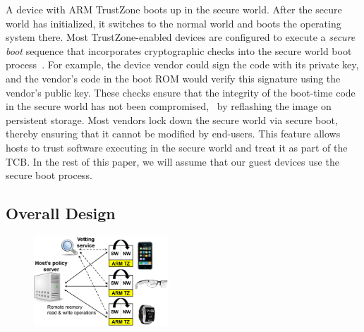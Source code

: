 A device with ARM TrustZone boots up in the secure world. After the secure
world has initialized, it switches to the normal world and boots the operating
system there. Most TrustZone-enabled devices are configured to execute a
\textit{secure boot} sequence that incorporates cryptographic checks into the
secure world boot process~\cite{armtz}. For example, the device vendor could
sign the code with its private key, and the vendor's code in the boot ROM would
verify this signature using the vendor's public key. These checks ensure that
the integrity of the boot-time code in the secure world has not been
compromised, \eg~by reflashing the image on persistent storage. Most vendors
lock down the secure world via secure boot, thereby ensuring that it cannot be
modified by end-users. This feature allows hosts to trust software executing in
the secure world and treat it as part of the TCB. In the rest of this paper, we
will assume that our guest devices use the secure boot process.

\subsection{Overall Design}
\label{section:mechanism:overall}

\begin{figure}[t!]
\centering
\includegraphics[keepaspectratio=true,width=0.45\textwidth]{figures/host-guest.png}
\indent\vspace{-0.4cm}
{\label{figure:hostguest}}
\indent\vspace{-0.55cm}
\end{figure}

